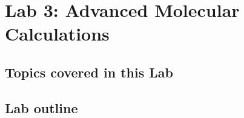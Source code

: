 \chapter{Lab 3: Advanced Molecular Calculations}
\label{chap:lab_advanced_molecules}



\section{Topics covered in this Lab}

\section{Lab outline}


